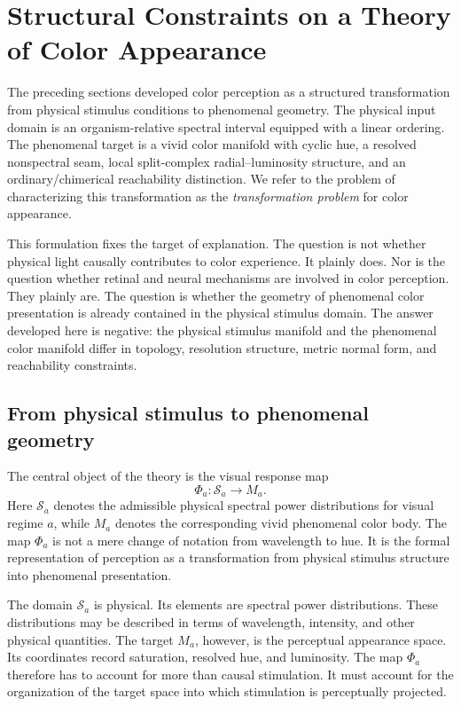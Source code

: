 \documentclass[preprint,12pt,authoryear]{elsarticle}
\theoremstyle{plain}
\theoremstyle{definition}
\theoremstyle{remark}
\begin{document}
\section{Structural Constraints on a Theory of Color Appearance}
\label{sec:structural-constraints}

\noindent The preceding sections developed color perception as a structured transformation from physical stimulus conditions to phenomenal geometry. The physical input domain is an organism-relative spectral interval equipped with a linear ordering. The phenomenal target is a vivid color manifold with cyclic hue, a resolved nonspectral seam, local split-complex radial--luminosity structure, and an ordinary/chimerical reachability distinction. We refer to the problem of characterizing this transformation as the \emph{transformation problem} for color appearance.

This formulation fixes the target of explanation. The question is not whether physical light causally contributes to color experience. It plainly does. Nor is the question whether retinal and neural mechanisms are involved in color perception. They plainly are. The question is whether the geometry of phenomenal color presentation is already contained in the physical stimulus domain. The answer developed here is negative: the physical stimulus manifold and the phenomenal color manifold differ in topology, resolution structure, metric normal form, and reachability constraints.

\subsection{From physical stimulus to phenomenal geometry}
\label{subsec:physical-stimulus-phenomenal-geometry}

\noindent The central object of the theory is the visual response map
\[
\Phi_a:\mathcal{S}_a\longrightarrow M_a.
\]
Here $\mathcal{S}_a$ denotes the admissible physical spectral power distributions for visual regime $a$, while $M_a$ denotes the corresponding vivid phenomenal color body. The map $\Phi_a$ is not a mere change of notation from wavelength to hue. It is the formal representation of perception as a transformation from physical stimulus structure into phenomenal presentation.

The domain $\mathcal{S}_a$ is physical. Its elements are spectral power distributions. These distributions may be described in terms of wavelength, intensity, and other physical quantities. The target $M_a$, however, is the perceptual appearance space. Its coordinates record saturation, resolved hue, and luminosity. The map $\Phi_a$ therefore has to account for more than causal stimulation. It must account for the organization of the target space into which stimulation is perceptually projected.
\end{document}
